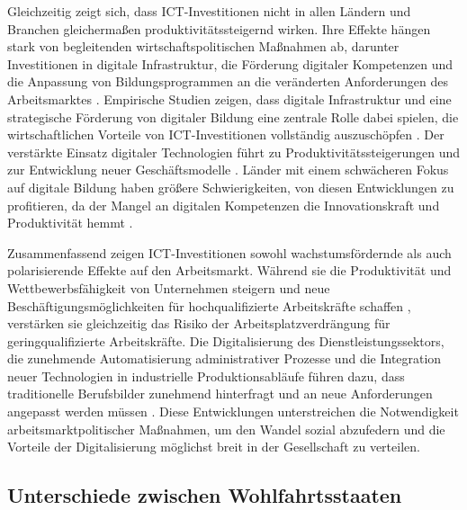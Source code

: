 Gleichzeitig zeigt sich, dass \ac{ICT}-Investitionen nicht in allen Ländern und Branchen 
gleichermaßen produktivitätssteigernd wirken. Ihre Effekte hängen stark von begleitenden 
wirtschaftspolitischen Maßnahmen ab, darunter Investitionen in digitale Infrastruktur, 
die Förderung digitaler Kompetenzen und die Anpassung von Bildungsprogrammen an die 
veränderten Anforderungen des Arbeitsmarktes 
\parencite[vgl.][Kap. 13]{brynjolfsson2014thesecond}. Empirische 
Studien zeigen, dass digitale Infrastruktur und eine strategische Förderung von digitaler 
Bildung eine zentrale Rolle dabei spielen, die wirtschaftlichen Vorteile von 
\ac{ICT}-Investitionen vollständig auszuschöpfen \parencite[vgl.][S. 357–358]{vu2011ict}. Der 
verstärkte Einsatz digitaler Technologien führt zu Produktivitätssteigerungen und
zur Entwicklung neuer Geschäftsmodelle \parencite[vgl.][S. 361-362]{vu2011ict}. 
Länder mit einem schwächeren Fokus auf digitale Bildung haben größere Schwierigkeiten, 
von diesen Entwicklungen zu profitieren, da der Mangel an digitalen Kompetenzen die 
Innovationskraft und Produktivität hemmt \parencite[vgl.][S. 19]{oecd2020digital}.

Zusammenfassend zeigen \ac{ICT}-Investitionen sowohl wachstumsfördernde als auch 
polarisierende Effekte auf den Arbeitsmarkt. Während sie die Produktivität und 
Wettbewerbsfähigkeit von Unternehmen steigern und neue Beschäftigungsmöglichkeiten für 
hochqualifizierte Arbeitskräfte schaffen \parencite[vgl.][S. 19–20]{oecd2020digital}, 
verstärken sie gleichzeitig das Risiko der Arbeitsplatzverdrängung für geringqualifizierte 
Arbeitskräfte. Die Digitalisierung des Dienstleistungssektors, die zunehmende Automatisierung 
administrativer Prozesse und die Integration neuer Technologien in industrielle 
Produktionsabläufe führen dazu, dass traditionelle Berufsbilder zunehmend hinterfragt und 
an neue Anforderungen angepasst werden müssen \parencite[vgl.][S. 20]{oecd2020digital}. Diese 
Entwicklungen unterstreichen die Notwendigkeit arbeitsmarktpolitischer Maßnahmen, um den 
Wandel sozial abzufedern und die Vorteile der Digitalisierung möglichst breit in der 
Gesellschaft zu verteilen.


\subsection{Unterschiede zwischen Wohlfahrtsstaaten}

